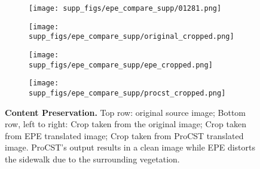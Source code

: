 \documentclass[letterpaper]{article} \usepackage[]{aaai23}  \usepackage{times}  \usepackage{helvet}  \usepackage{courier}  \usepackage[hyphens]{url}  \usepackage{graphicx} \urlstyle{rm} \def\UrlFont{\rm}  \usepackage{natbib}  \usepackage{caption} \frenchspacing  \setlength{\pdfpagewidth}{8.5in} \setlength{\pdfpageheight}{11in} \usepackage{algorithm}
\begin{document}
\begin{figure*}
    \centering
    \begin{subfigure}{0.7\linewidth}
        \centering
        \texttt{[image: supp\_figs/epe\_compare\_supp/01281.png]}
    \end{subfigure}
    \begin{subfigure}{0.32\linewidth}
        \centering
        \texttt{[image: supp\_figs/epe\_compare\_supp/original\_cropped.png]}
    \end{subfigure}
    \begin{subfigure}{0.32\linewidth}
        \centering
        \texttt{[image: supp\_figs/epe\_compare\_supp/epe\_cropped.png]}
    \end{subfigure}
    \begin{subfigure}{0.32\linewidth}
        \centering
        \texttt{[image: supp\_figs/epe\_compare\_supp/procst\_cropped.png]}
    \end{subfigure}
    \caption{\textbf{Content Preservation.} Top row: original source image; Bottom row, left to right: Crop taken from the original image; Crop taken from EPE translated image; Crop taken from ProCST translated image. ProCST's output results in a clean image while EPE \cite{richter2021enhancing} distorts the sidewalk due to the surrounding vegetation.}
    \label{fig:epe_compare_vegetation}
\end{figure*}
\end{document}
